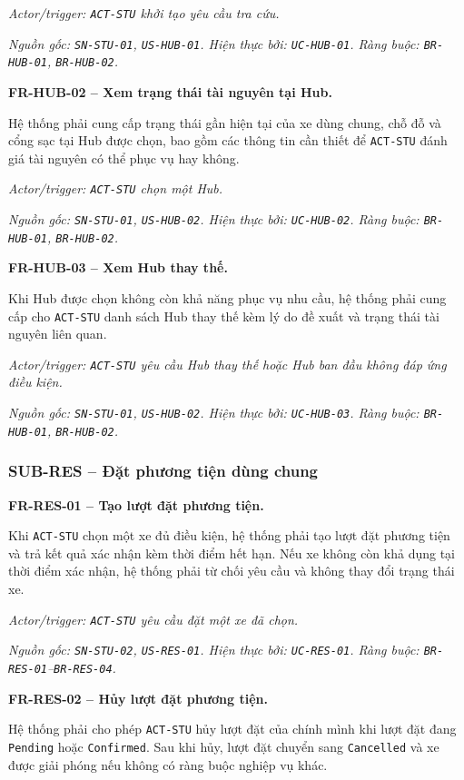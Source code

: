 \textit{Actor/trigger: \texttt{ACT-STU} khởi tạo yêu cầu tra cứu.}\par
\textit{Nguồn gốc: \texttt{SN-STU-01}, \texttt{US-HUB-01}. Hiện thực bởi: \texttt{UC-HUB-01}. Ràng buộc: \texttt{BR-HUB-01}, \texttt{BR-HUB-02}.}

\medskip
\noindent\textbf{FR-HUB-02 -- Xem trạng thái tài nguyên tại Hub.}\par
\nopagebreak[4]
Hệ thống phải cung cấp trạng thái gần hiện tại của xe dùng chung, chỗ đỗ và cổng sạc tại Hub được chọn, bao gồm các thông tin cần thiết để \texttt{ACT-STU} đánh giá tài nguyên có thể phục vụ hay không.

\textit{Actor/trigger: \texttt{ACT-STU} chọn một Hub.}\par
\textit{Nguồn gốc: \texttt{SN-STU-01}, \texttt{US-HUB-02}. Hiện thực bởi: \texttt{UC-HUB-02}. Ràng buộc: \texttt{BR-HUB-01}, \texttt{BR-HUB-02}.}

\medskip
\noindent\textbf{FR-HUB-03 -- Xem Hub thay thế.}\par
\nopagebreak[4]
Khi Hub được chọn không còn khả năng phục vụ nhu cầu, hệ thống phải cung cấp cho \texttt{ACT-STU} danh sách Hub thay thế kèm lý do đề xuất và trạng thái tài nguyên liên quan.

\textit{Actor/trigger: \texttt{ACT-STU} yêu cầu Hub thay thế hoặc Hub ban đầu không đáp ứng điều kiện.}\par
\textit{Nguồn gốc: \texttt{SN-STU-01}, \texttt{US-HUB-02}. Hiện thực bởi: \texttt{UC-HUB-03}. Ràng buộc: \texttt{BR-HUB-01}, \texttt{BR-HUB-02}.}

\subsubsection{SUB-RES -- Đặt phương tiện dùng chung}

\noindent\textbf{FR-RES-01 -- Tạo lượt đặt phương tiện.}\par
\nopagebreak[4]
Khi \texttt{ACT-STU} chọn một xe đủ điều kiện, hệ thống phải tạo lượt đặt phương tiện và trả kết quả xác nhận kèm thời điểm hết hạn. Nếu xe không còn khả dụng tại thời điểm xác nhận, hệ thống phải từ chối yêu cầu và không thay đổi trạng thái xe.

\textit{Actor/trigger: \texttt{ACT-STU} yêu cầu đặt một xe đã chọn.}\par
\textit{Nguồn gốc: \texttt{SN-STU-02}, \texttt{US-RES-01}. Hiện thực bởi: \texttt{UC-RES-01}. Ràng buộc: \texttt{BR-RES-01}--\texttt{BR-RES-04}.}

\medskip
\noindent\textbf{FR-RES-02 -- Hủy lượt đặt phương tiện.}\par
\nopagebreak[4]
Hệ thống phải cho phép \texttt{ACT-STU} hủy lượt đặt của chính mình khi lượt đặt đang \texttt{Pending} hoặc \texttt{Confirmed}. Sau khi hủy, lượt đặt chuyển sang \texttt{Cancelled} và xe được giải phóng nếu không có ràng buộc nghiệp vụ khác.

